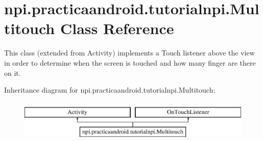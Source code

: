 \hypertarget{classnpi_1_1practicaandroid_1_1tutorialnpi_1_1_multitouch}{\section{npi.\-practicaandroid.\-tutorialnpi.\-Multitouch Class Reference}
\label{classnpi_1_1practicaandroid_1_1tutorialnpi_1_1_multitouch}
}


This class (extended from Activity) implements a Touch listener above the view in order to determine when the screen is touched and how many finger are there on it.  


Inheritance diagram for npi.\-practicaandroid.\-tutorialnpi.\-Multitouch\-:\begin{figure}[H]
\begin{center}
\leavevmode
\includegraphics[height=2.000000cm]{classnpi_1_1practicaandroid_1_1tutorialnpi_1_1_multitouch}
\end{center}
\end{figure}
